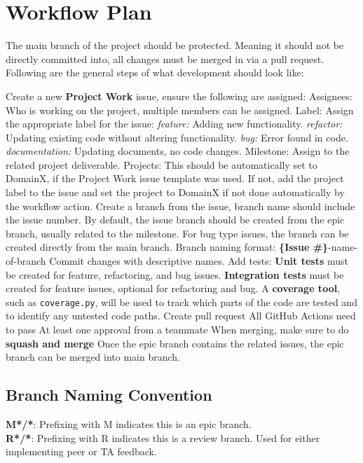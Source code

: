 \documentclass{article}
\begin{document}
\section{Workflow Plan}
The main branch of the project should be protected. Meaning it should not be directly committed into, all changes must be merged in via a pull request.
Following are the general steps of what development should look like:
\begin{outline}[itemize]
 \1 Create a new \textbf{Project Work} issue, ensure the following are assigned:
  \2 Assignees: Who is working on the project, multiple members can be assigned.
  \2 Label: Assign the appropriate label for the issue:
    \3 \textit{feature:} Adding new functionality.
    \3 \textit{refactor:} Updating existing code without altering functionality.
    \3 \textit{bug:} Error found in code.
    \3 \textit{documentation:} Updating documents, no code changes.
  \2 Milestone: Assign to the related project deliverable.
  \2 Projects: This should be automatically set to DomainX, if the Project Work issue template was used.
    \3 If not, add the project label to the issue and set the project to DomainX if not done automatically by the workflow action.
\1 Create a branch from the issue, branch name should include the issue number.
  \2 By default, the issue branch should be created from the epic branch, usually related to the milestone.
  \2 For bug type issues, the branch can be created directly from the main branch.
  \2 Branch naming format: \textbf{\{Issue \#\}}-name-of-branch
\1 Commit changes with descriptive names.
\1 Add tests:
  \2 \textbf{Unit tests} must be created for feature, refactoring, and bug issues.
  \2 \textbf{Integration tests} must be created for feature issues, optional for refactoring and bug.
\2 A \textbf{coverage tool}, such as \texttt{coverage.py}, will be used to track which parts of the code are tested and to identify any untested code paths.
\1 Create pull request
  \2 All GitHub Actions need to pass
  \2 At least one approval from a teammate
  \2 When merging, make sure to do \textbf{squash and merge}
\1 Once the epic branch contains the related issues, the epic branch can be merged into main branch.
\end{outline}

\subsection{Branch Naming Convention}
\textbf{M*/*}: Prefixing with M indicates this is an epic branch. \\
\textbf{R*/*}: Prefixing with R indicates this is a review branch. Used for either implementing peer or TA feedback. \\
\end{document}
